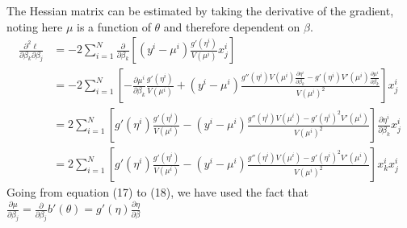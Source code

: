 \documentclass[12pt, oneside]{article}
\begin{document}
The Hessian matrix can be estimated by taking the derivative of the gradient, noting here $\mu$ is a function of $\theta$ and therefore dependent on $\beta$.
\begin{align}
\frac{\partial^2 \ell}{\partial\beta_k\partial \beta_j}&=-2\sum_{i=1}^{N}\frac{\partial}{\partial \beta_k}\left[(y^i-\mu^i)\frac{g'(\eta^i)}{V(\mu^i)}x^i_j\right]\\
&=-2\sum_{i=1}^{N}\left[-\frac{\partial \mu^i}{\partial \beta_k}\frac{g'(\eta^i)}{V(\mu^i)}
+(y^i-\mu^i)\frac{g''(\eta^i)V(\mu^i)\frac{\partial \eta^i}{\partial \beta_k}-g'(\eta^i)V'(\mu^i)\frac{\partial \mu^i}{\partial \beta_k}}{V(\mu^i)^2}\right]x^i_j\\ 
&=2\sum_{i=1}^{N}\left[g'(\eta^i)\frac{g'(\eta^i)}{V(\mu^i)}
-(y^i-\mu^i)\frac{g''(\eta^i)V(\mu^i)-g'(\eta^i)^2V'(\mu^i)}{V(\mu^i)^2}\right]\frac{\partial \eta^i}{\partial \beta_k}x^i_j\\
&=2\sum_{i=1}^{N}\left[g'(\eta^i)\frac{g'(\eta^i)}{V(\mu^i)}
-(y^i-\mu^i)\frac{g''(\eta^i)V(\mu^i)-g'(\eta^i)^2V'(\mu^i)}{V(\mu^i)^2}\right]x^i_k x^i_j
\end{align}
Going from equation (17) to (18), we have used the fact that $\frac{\partial\mu}{\partial\beta_j}=\frac{\partial}{\partial\beta_j}b'(\theta)=g'(\eta)\frac{\partial \eta}{\partial \beta}$
\end{document}
